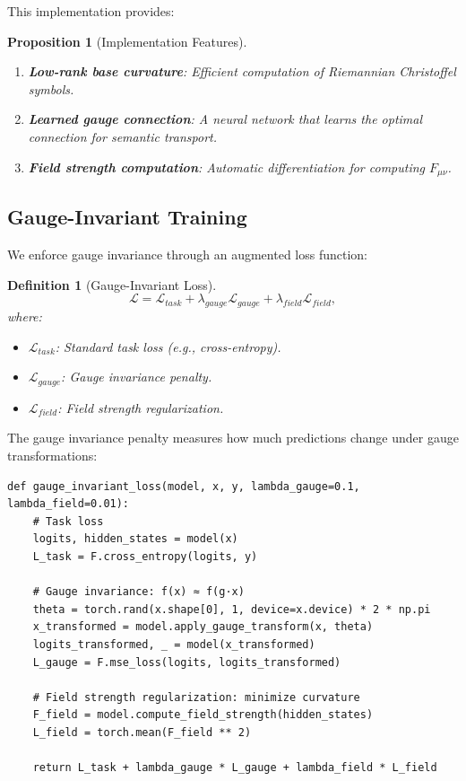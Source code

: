 \documentclass[12pt,letterpaper,twoside]{article}
\newtheorem{definition}{Definition}[section]
\newtheorem{prop}{Proposition}[section]
\begin{document}
This implementation provides:

\begin{prop}[Implementation Features]
\begin{enumerate}
\item \textbf{Low-rank base curvature}: Efficient computation of Riemannian Christoffel symbols.
\item \textbf{Learned gauge connection}: A neural network that learns the optimal connection for semantic transport.
\item \textbf{Field strength computation}: Automatic differentiation for computing $F_{\mu\nu}$.
\end{enumerate}
\end{prop}

\subsection{Gauge-Invariant Training}

We enforce gauge invariance through an augmented loss function:

\begin{definition}[Gauge-Invariant Loss]
\[
\mathcal{L} = \mathcal{L}_{task} + \lambda_{gauge} \mathcal{L}_{gauge} + \lambda_{field} \mathcal{L}_{field},
\]
where:
\begin{itemize}
\item $\mathcal{L}_{task}$: Standard task loss (e.g., cross-entropy).
\item $\mathcal{L}_{gauge}$: Gauge invariance penalty.
\item $\mathcal{L}_{field}$: Field strength regularization.
\end{itemize}
\end{definition}

The gauge invariance penalty measures how much predictions change under gauge transformations:

\begin{verbatim}
def gauge_invariant_loss(model, x, y, lambda_gauge=0.1, lambda_field=0.01):
    # Task loss
    logits, hidden_states = model(x)
    L_task = F.cross_entropy(logits, y)
    
    # Gauge invariance: f(x) ≈ f(g·x)
    theta = torch.rand(x.shape[0], 1, device=x.device) * 2 * np.pi
    x_transformed = model.apply_gauge_transform(x, theta)
    logits_transformed, _ = model(x_transformed)
    L_gauge = F.mse_loss(logits, logits_transformed)
    
    # Field strength regularization: minimize curvature
    F_field = model.compute_field_strength(hidden_states)
    L_field = torch.mean(F_field ** 2)
    
    return L_task + lambda_gauge * L_gauge + lambda_field * L_field
\end{verbatim}
\end{document}
